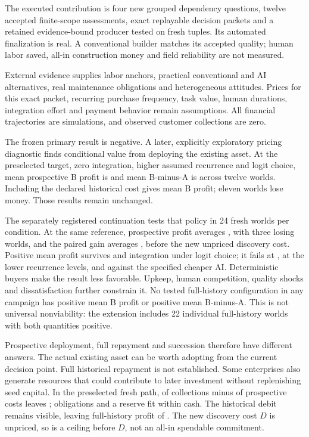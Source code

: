 The executed contribution is four new grouped dependency questions, twelve accepted finite-scope
assessments, exact replayable decision packets and a retained evidence-bound producer tested on
fresh tuples. Its automated finalization is real. A conventional builder matches its accepted
quality; human labor saved, all-in construction money and field reliability are not measured.

External evidence supplies labor anchors, practical conventional and AI alternatives, real
maintenance obligations and heterogeneous attitudes. Prices for this exact packet, recurring
purchase frequency, task value, human durations, integration effort and payment behavior remain
assumptions. All financial trajectories are simulations, and observed customer collections are zero.

The frozen primary result is negative. A later, explicitly exploratory pricing diagnostic finds
conditional value from deploying the existing asset. At the preselected  target,
zero integration, higher assumed recurrence and logit choice, mean prospective B profit is
 and mean B-minus-A is  across twelve worlds. Including the declared
historical cost gives  mean B profit; eleven worlds lose money. Those results
remain unchanged.

The separately registered continuation tests that policy in 24 fresh worlds per condition.
At the same reference, prospective profit averages , with three losing worlds,
and the paired gain averages , before the new unpriced discovery cost.
Positive mean profit survives  and  integration under logit choice;
it fails at , at the lower recurrence levels, and against the specified cheaper AI.
Deterministic buyers make the result less favorable. Upkeep, human competition, quality shocks
and dissatisfaction further constrain it. No tested full-history configuration in any campaign
has positive mean B profit or positive mean B-minus-A. This is not universal nonviability:
the extension includes 22 individual full-history worlds with both quantities positive.

Prospective deployment, full repayment and succession therefore have different answers.
The actual existing asset can be worth adopting from the current decision point. Full historical
repayment is not established. Some enterprises also generate resources that could contribute
to later investment without replenishing seed capital. In the preselected fresh path,
 of collections minus  of prospective costs leaves ;
obligations and a  reserve fit within cash. The historical debit remains visible,
leaving full-history profit of . The new discovery cost \(D\) is unpriced,
so  is a ceiling before \(D\), not an all-in spendable commitment.

